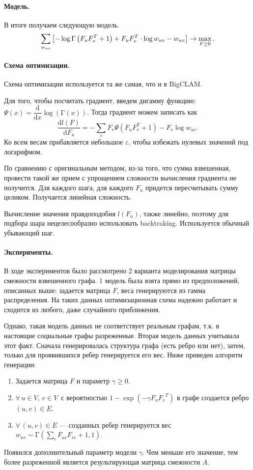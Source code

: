 \documentclass{ITaSconf}
\begin{document}
\paragraph{Модель.} В итоге получаем следующую модель.
$$
\sum_{w_{uv}}\left[-\log\mathrm{\Gamma}\left( F_u F_v^T + 1 \right) + F_u F_v^T \cdot\log w_{uv} - w_{uv}\right] \rightarrow \max_{F\ge 0}. \\
$$

\paragraph{Схема оптимизации.}

Схема оптимизации используется та же самая, что и в BigCLAM.

Для того, чтобы посчитать градиент, введем дигамму функцию: $\Psi(x) = \dfrac{\mathrm{d}}{\mathrm{d}x} \log\left(\mathrm\Gamma(x)\right)$.
Тогда градиент можем записать как
$$\dfrac{\mathrm{d}l(F)}{\mathrm{d}F_u} = - \sum_v F_v \Psi\left(F_u F_v^T + 1\right) - F_v \log w_{uv}.$$
Ко всем весам прибавляется небольшое $\varepsilon$, чтобы избежать нулевых значений под логарифмом.

По сравнению с оригинальным методом, из-за того, что сумма взвешенная, провести такой же прием с упрощением сложности вычисления градиента не получится. 
Для каждого шага, для каждого $F_u$ придется пересчитывать сумму целиком. 
Получается линейная сложность. 

Вычисление значения правдоподобия $l(F_u)$, также линейно, поэтому для подбора шара нецелесообразно использовать backtraking. 
Используется обычный убывающий шаг.

\paragraph{Эксперименты.}
В ходе экспериментов было рассмотрено 2 варианта моделирования матрицы смежности взвешенного графа.
1 модель была взята прямо из предположений, описанных выше: задается матрица $F$, веса генерируются из гамма распределения.
На таких данных оптимизационная схема надежно работает и сходится из любого, даже случайного приближения.

Однако, такая модель данных не соответствует реальным графам, т.к. в настоящие социальные графы разреженные. 
Вторая модель данных учитывала этот факт. 
Сначала генерировалась структура графа (есть ребро или нет), затем, только для проявившихся ребер генерируется его вес. 
Ниже приведен алгоритм генерации:
\begin{enumerate}
	\item Задается матрица $F$ и параметр $\gamma \ge 0 $.
	\item $\forall\, u \in V, \, v \in V \,$ с вероятностью $1 - \exp(-\gamma F_u {F_v}^T)$ в графе создается ребро $(u, v) \in E$.
	\item $\forall\, (u, v) \in E$ --- созданных ребер генерируется вес $w_{uv} \sim \mathrm{\Gamma}\left(\sum_c F_{uc} F_{vc} + 1, 1\right)$.
\end{enumerate}
Появился дополнительный параметр модели $\gamma$. 
Чем меньше его значение, тем более разреженной является результирующая матрица смежности $A$.
\end{document}

